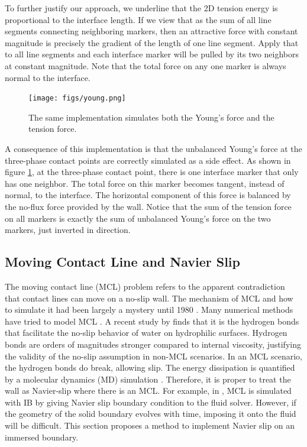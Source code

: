 \documentclass{jfm}
\begin{document}
To further justify our approach, we underline that the 2D tension energy is proportional to the interface length. If we view that as the sum of all line segments connecting neighboring markers, then an attractive force with constant magnitude is precisely the gradient of the length of one line segment. Apply that to all line segments and each interface marker will be pulled by its two neighbors at constant magnitude. Note that the total force on any one marker is always normal to the interface. 

\begin{figure}
    \centering
    \texttt{[image: figs/young.png]}
    \caption{\label{fig:young}
        The same implementation simulates both the Young's force and the tension force. 
    }
\end{figure}
A consequence of this implementation is that the unbalanced Young’s force at the three-phase contact points are correctly simulated as a side effect. As shown in figure \ref{fig:young}, at the three-phase contact point, there is one interface marker that only has one neighbor. The total force on this marker becomes tangent, instead of normal, to the interface. The horizontal component of this force is balanced by the no-flux force provided by the wall. Notice that the sum of the tension force on all markers is exactly the sum of unbalanced Young’s force on the two markers, just inverted in direction. 

\subsection{Moving Contact Line and Navier Slip} \label{subsec:mcl}
The moving contact line (MCL) problem refers to the apparent contradiction that contact lines can move on a no-slip wall. The mechanism of MCL and how to simulate it had been largely a mystery until 1980 \citep{1979_MCL_confusion}. Many numerical methods have tried to model MCL \citep{2014_MCL_review, curved_solid_DI_IB}. A recent study by \cite{its_the_bonds_original} finds that it is the hydrogen bonds that facilitate the no-slip behavior of water on hydrophilic surfaces. Hydrogen bonds are orders of magnitudes stronger compared to internal viscosity, justifying the validity of the no-slip assumption in non-MCL scenarios. In an MCL scenario, the hydrogen bonds do break, allowing slip. The energy dissipation is quantified by a molecular dynamics (MD) simulation \citep{MD_2018_its_the_bonds}. Therefore, it is proper to treat the wall as Navier-slip where there is an MCL. For example, in \cite{MCL_IBM_surfactant}, MCL is simulated with IB by giving Navier slip boundary condition to the fluid solver. However, if the geometry of the solid boundary evolves with time, imposing it onto the fluid will be difficult. This section proposes a method to implement Navier slip on an immersed boundary. 
\end{document}
